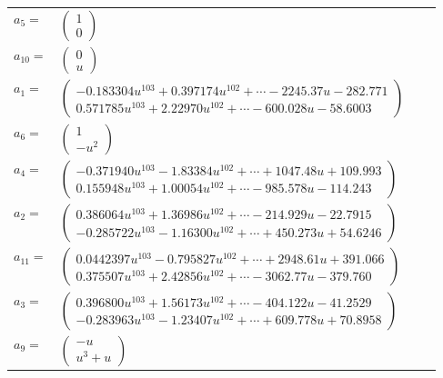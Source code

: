 \documentclass[1p]{elsarticle_modified}
\theoremstyle{definition}
\begin{document}
\begin{tabular}{m{7pt} m{180pt} m{7pt} m{180pt} }
\flushright $a_{5}=$&$\begin{pmatrix}1\\0\end{pmatrix}$ \\
\flushright $a_{10}=$&$\begin{pmatrix}0\\u\end{pmatrix}$ \\
\flushright $a_{1}=$&$\begin{pmatrix}-0.183304 u^{103}+0.397174 u^{102}+\cdots-2245.37 u-282.771\\0.571785 u^{103}+2.22970 u^{102}+\cdots-600.028 u-58.6003\end{pmatrix}$ \\
\flushright $a_{6}=$&$\begin{pmatrix}1\\- u^2\end{pmatrix}$ \\
\flushright $a_{4}=$&$\begin{pmatrix}-0.371940 u^{103}-1.83384 u^{102}+\cdots+1047.48 u+109.993\\0.155948 u^{103}+1.00054 u^{102}+\cdots-985.578 u-114.243\end{pmatrix}$ \\
\flushright $a_{2}=$&$\begin{pmatrix}0.386064 u^{103}+1.36986 u^{102}+\cdots-214.929 u-22.7915\\-0.285722 u^{103}-1.16300 u^{102}+\cdots+450.273 u+54.6246\end{pmatrix}$ \\
\flushright $a_{11}=$&$\begin{pmatrix}0.0442397 u^{103}-0.795827 u^{102}+\cdots+2948.61 u+391.066\\0.375507 u^{103}+2.42856 u^{102}+\cdots-3062.77 u-379.760\end{pmatrix}$ \\
\flushright $a_{3}=$&$\begin{pmatrix}0.396800 u^{103}+1.56173 u^{102}+\cdots-404.122 u-41.2529\\-0.283963 u^{103}-1.23407 u^{102}+\cdots+609.778 u+70.8958\end{pmatrix}$ \\
\flushright $a_{9}=$&$\begin{pmatrix}- u\\u^3+u\end{pmatrix}$ \\

\end{tabular}
\end{document}
